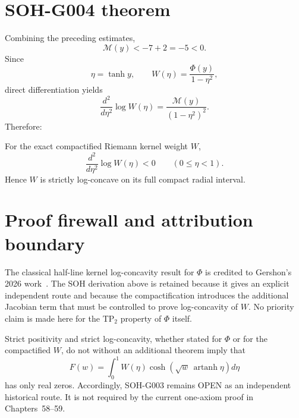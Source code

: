\section{SOH-G004 theorem}

Combining the preceding estimates,
\[
\mathcal M(y)<-7+2=-5<0.
\]
Since
\[
\eta=\tanh y,
\qquad
W(\eta)=\frac{\Phi(y)}{1-\eta^2},
\]
direct differentiation yields
\[
\frac{d^2}{d\eta^2}\log W(\eta)
=\frac{\mathcal M(y)}{(1-\eta^2)^2}.
\]
Therefore:

\begin{theorem}[SOH-G004]
For the exact compactified Riemann kernel weight \(W\),
\[
\boxed{
\frac{d^2}{d\eta^2}\log W(\eta)<0
\qquad(0\le\eta<1).
}
\]
Hence \(W\) is strictly log-concave on its full compact radial interval.
\end{theorem}

\section{Proof firewall and attribution boundary}

The classical half-line kernel log-concavity result for $\Phi$ is credited to Gershon's 2026 work~\cite{gershon2026logconcavity}. The SOH derivation above is retained because it gives an explicit independent route and because the compactification introduces the additional Jacobian term that must be controlled to prove log-concavity of $W$. No priority claim is made here for the TP$_2$ property of $\Phi$ itself.

Strict positivity and strict log-concavity, whether stated for $\Phi$ or for the compactified $W$, do not without an additional theorem imply that
\[
F(w)=\int_0^1W(\eta)\cosh\!\left(\sqrt w\,\operatorname{artanh}\eta\right)d\eta
\]
has only real zeros. Accordingly, SOH-G003 remains OPEN as an independent historical route. It is not required by the current one-axiom proof in Chapters~58--59.
